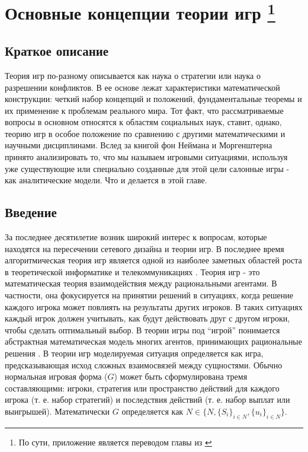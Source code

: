 \section{Основные концепции теории
игр
\footnote{
По сути, приложение является переводом главы из \cite{Association:2018aa}
}
}



\subsection{Краткое
описание}

Теория игр по-разному описывается как наука о стратегии или наука о
разрешении конфликтов. В ее основе лежат характеристики математической
конструкции: четкий набор концепций и положений, фундаментальные теоремы
и их применение к проблемам реального мира. Тот факт, что
рассматриваемые вопросы в основном относятся к областям социальных наук,
ставит, однако, теорию игр в особое положение по сравнению с другими
математическими и научными дисциплинами. Вслед за книгой фон Неймана и
Моргенштерна принято анализировать то, что мы называем игровыми
ситуациями, используя уже существующие или специально созданные для этой
цели салонные игры - как аналитические модели. Что и делается в этой
главе.

\subsection{Введение}

За последнее десятилетие возник широкий интерес к вопросам, которые
находятся на пересечении сетевого дизайна и теории игр. В последнее
время алгоритмическая теория игр является одной из наиболее заметных
областей роста в теоретической информатике и телекоммуникациях
\cite{Wooldridge:2012}. Теория игр - это математическая теория
взаимодействия между рациональными агентами. В частности, она
фокусируется на принятии решений в ситуациях, когда решение каждого
игрока может повлиять на результаты других игроков. В таких ситуациях
каждый игрок должен учитывать, как будут действовать друг с другом
игроки, чтобы сделать оптимальный выбор. В теории игры под ``игрой''
понимается абстрактная математическая модель многих агентов, принимающих
рациональные решения \cite{Wooldridge:2012}. В теории игр моделируемая
ситуация определяется как игра, предсказывающая исход сложных
взаимосвязей между сущностями. Обычно нормальная игровая форма (\(G\))
может быть сформулирована тремя составляющими: игроки, стратегия или
пространство действий для каждого игрока (т. е. набор стратегий) и
последствия действий (т. е. набор выплат или выигрышей). Математически
\(G\) определяется как
\(N\in \{N, \{S_i\}_{i\in N}, \{u_i\}_{i\in N}\}\).

